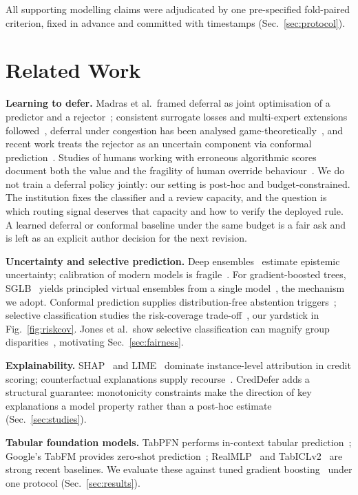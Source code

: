\documentclass[conference]{IEEEtran}
\begin{document}
All supporting modelling claims were adjudicated by one pre-specified
fold-paired criterion, fixed in advance and committed with timestamps
(Sec.~\ref{sec:protocol}).

\section{Related Work}\label{sec:related}
\textbf{Learning to defer.} Madras et al.\ framed deferral as joint
optimisation of a predictor and a rejector~\cite{madras2018}; consistent
surrogate losses and multi-expert extensions
followed~\cite{mozannar2020,mao2023}, deferral under congestion has been
analysed game-theoretically~\cite{lykouris2024}, and recent work treats the
rejector as an uncertain component via conformal prediction~\cite{fang2026}.
Studies of humans working with erroneous algorithmic scores document both
the value and the fragility of human override
behaviour~\cite{dearteaga2020}. We do not train a deferral policy jointly:
our setting is post-hoc and budget-constrained. The institution fixes the
classifier and a review capacity, and the question is which routing signal
deserves that capacity and how to verify the deployed rule. A learned
deferral or conformal baseline under the same budget is a fair ask and is
left as an explicit author decision for the next revision.

\textbf{Uncertainty and selective prediction.} Deep
ensembles~\cite{lakshminarayanan2017} estimate epistemic uncertainty;
calibration of modern models is fragile~\cite{guo2017}. For gradient-boosted
trees, SGLB~\cite{ustimenko2021} yields principled virtual ensembles from a
single model~\cite{malinin2021}, the mechanism we adopt. Conformal
prediction supplies distribution-free abstention
triggers~\cite{angelopoulos2023}; selective classification studies the
risk-coverage trade-off~\cite{geifman2017}, our yardstick in
Fig.~\ref{fig:riskcov}. Jones et al.\ show selective classification can
magnify group disparities~\cite{jones2021}, motivating
Sec.~\ref{sec:fairness}.

\textbf{Explainability.} SHAP~\cite{lundberg2017} and LIME~\cite{ribeiro2016}
dominate instance-level attribution in credit scoring; counterfactual
explanations supply recourse~\cite{wachter2017}. CredDefer adds a structural
guarantee: monotonicity constraints make the direction of key explanations a
model property rather than a post-hoc estimate (Sec.~\ref{sec:studies}).

\textbf{Tabular foundation models.} TabPFN performs in-context tabular
prediction~\cite{hollmann2025,tabpfn25}; Google's TabFM provides zero-shot
prediction~\cite{tabfm2026}; RealMLP~\cite{holzmuller2024} and
TabICLv2~\cite{qu2026} are strong recent baselines. We evaluate these
against tuned gradient boosting~\cite{chen2016,ke2017,prokhorenkova2018}
under one protocol (Sec.~\ref{sec:results}).
\end{document}
